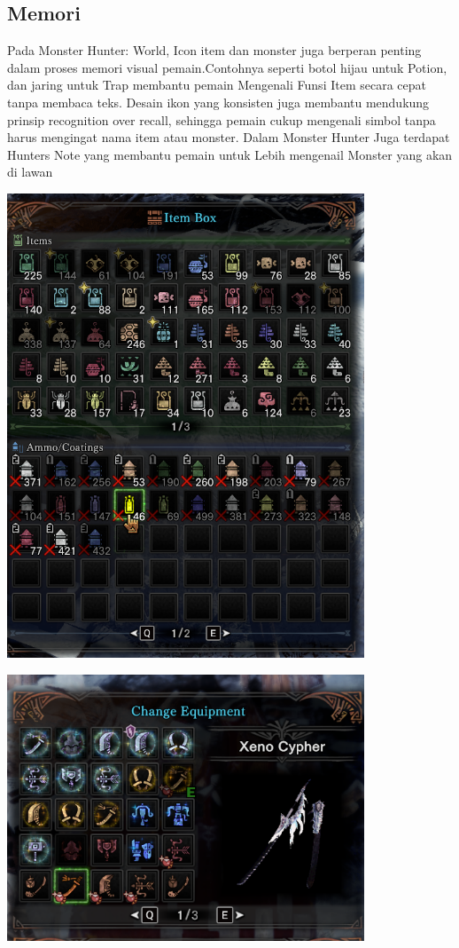 \documentclass[12pt]{article}
\begin{document}
\subsection{Memori}
Pada Monster Hunter: World, Icon item dan monster juga berperan penting dalam proses memori visual pemain.Contohnya seperti botol hijau untuk Potion, dan jaring untuk Trap membantu pemain Mengenali Funsi Item secara cepat tanpa membaca teks.
Desain ikon yang konsisten juga membantu mendukung prinsip recognition over recall, sehingga pemain cukup mengenali simbol tanpa harus mengingat nama item atau monster. Dalam Monster Hunter Juga terdapat Hunters Note yang membantu pemain untuk Lebih mengenail Monster yang akan di lawan
\begin{center}
    \includegraphics[width=0.8\textwidth]{Image/Item_List.png}
\end{center}
\begin{center}
    \includegraphics[width=0.8\textwidth]{Image/Gear_List.png}
\end{center}
\end{document}
